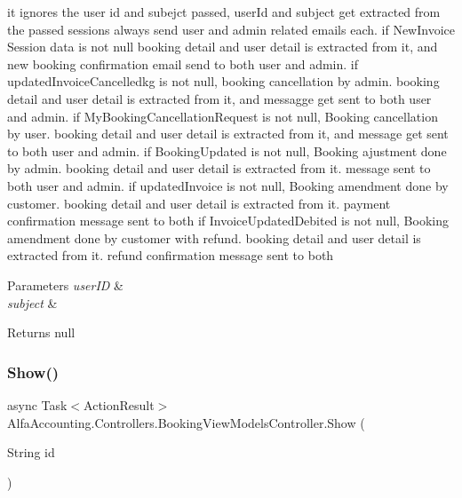 it ignores the user id and subejct passed, user\+Id and subject get extracted from the passed sessions always send user and admin related emails each. if New\+Invoice Session data is not null booking detail and user detail is extracted from it, and new booking confirmation email send to both user and admin. if updated\+Invoice\+Cancelledkg is not null, booking cancellation by admin. booking detail and user detail is extracted from it, and messagge get sent to both user and admin. if My\+Booking\+Cancellation\+Request is not null, Booking cancellation by user. booking detail and user detail is extracted from it, and message get sent to both user and admin. if Booking\+Updated is not null, Booking ajustment done by admin. booking detail and user detail is extracted from it. message sent to both user and admin. if updated\+Invoice is not null, Booking amendment done by customer. booking detail and user detail is extracted from it. payment confirmation message sent to both if Invoice\+Updated\+Debited is not null, Booking amendment done by customer with refund. booking detail and user detail is extracted from it. refund confirmation message sent to both 


\begin{DoxyParams}{Parameters}
{\em user\+ID} & \\
\hline
{\em subject} & \\
\hline
\end{DoxyParams}
\begin{DoxyReturn}{Returns}
null
\end{DoxyReturn}
\mbox{\label{class_alfa_accounting_1_1_controllers_1_1_booking_view_models_controller_aa3606d7cc1ee17ff8da3baaf866ea68b}} 
\subsubsection{\texorpdfstring{Show()}{Show()}}
{\footnotesize\ttfamily async Task$<$Action\+Result$>$ Alfa\+Accounting.\+Controllers.\+Booking\+View\+Models\+Controller.\+Show (\begin{DoxyParamCaption}\item[{String}]{id }\end{DoxyParamCaption})}



